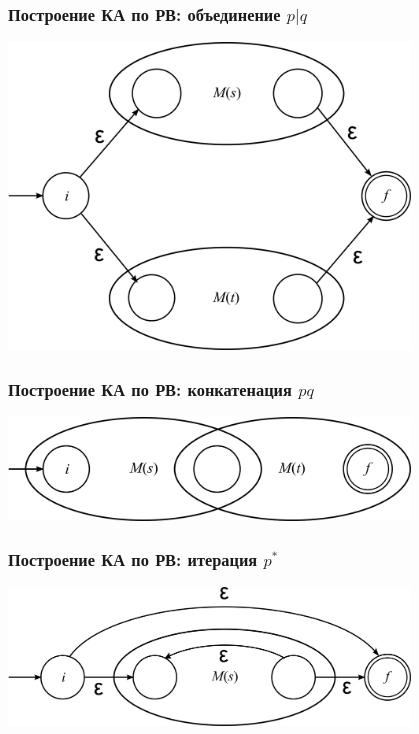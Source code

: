 \documentclass{beamer}
\begin{document}
\begin{frame}
  \transwipe[direction=90]
  \frametitle{Построение КА по РВ: объединение $p | q$}
    \begin{center}
      \includegraphics[width=0.80\textwidth]{pics/union.png}  
    \end{center}
\end{frame}

\begin{frame}
  \transwipe[direction=90]
  \frametitle{Построение КА по РВ: конкатенация $p q$}
    \begin{center}
      \includegraphics[width=0.80\textwidth]{pics/concat.png}  
    \end{center}
\end{frame}

\begin{frame}
  \transwipe[direction=90]
  \frametitle{Построение КА по РВ: итерация $p^*$}
    \begin{center}
      \includegraphics[width=0.80\textwidth]{pics/star.png}  
    \end{center}
\end{frame}
\end{document}
